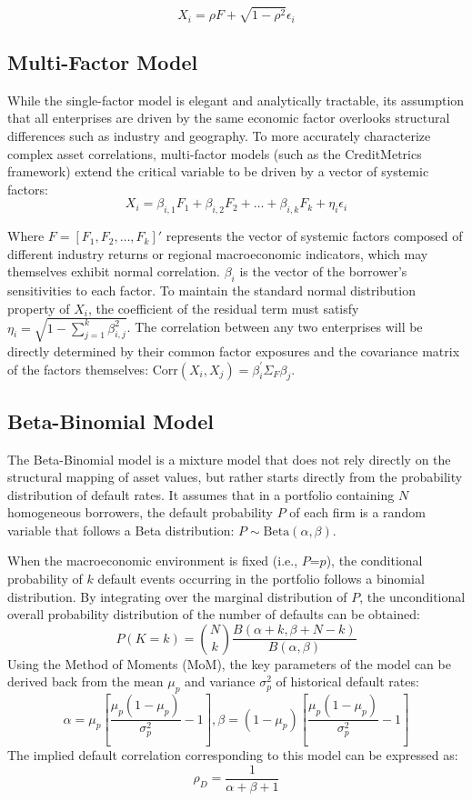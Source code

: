 \documentclass[12pt]{article}
\begin{document}
\[X_i = \rho F + \sqrt{1 - \rho^2} \epsilon_i\]

\subsection{Multi-Factor Model}
While the single-factor model is elegant and analytically tractable, its assumption that all enterprises are driven by the same economic factor overlooks structural differences such as industry and geography. To more accurately characterize complex asset correlations, multi-factor models (such as the CreditMetrics framework) extend the critical variable to be driven by a vector of systemic factors:
\[X_i = \beta_{i,1} F_1 + \beta_{i,2} F_2 + \dots + \beta_{i,k} F_k + \eta_i \epsilon_i\]

Where $F = [F_1, F_2, \dots, F_k]'$ represents the vector of systemic factors composed of different industry returns or regional macroeconomic indicators, which may themselves exhibit normal correlation. $\beta_i$ is the vector of the borrower's sensitivities to each factor. To maintain the standard normal distribution property of $X_i$, the coefficient of the residual term must satisfy $\eta_i = \sqrt{1 - \sum_{j=1}^{k} \beta_{i,j}^2}$. The correlation between any two enterprises will be directly determined by their common factor exposures and the covariance matrix of the factors themselves: $\text{Corr}(X_i, X_j) = \beta_i^\prime \Sigma_F \beta_j$.

\subsection{Beta-Binomial Model}
The Beta-Binomial model is a mixture model that does not rely directly on the structural mapping of asset values, but rather starts directly from the probability distribution of default rates. It assumes that in a portfolio containing $N$ homogeneous borrowers, the default probability $P$ of each firm is a random variable that follows a Beta distribution: $P \sim \text{Beta}(\alpha, \beta)$.

When the macroeconomic environment is fixed (i.e., $P$=$p$), the conditional probability of $k$ default events occurring in the portfolio follows a binomial distribution. By integrating over the marginal distribution of $P$, the unconditional overall probability distribution of the number of defaults can be obtained:
\[P(K=k) = \binom{N}{k} \frac{B(\alpha + k, \beta + N - k)}{B(\alpha, \beta)}\]
Using the Method of Moments (MoM), the key parameters of the model can be derived back from the mean $\mu_p$   and variance $\sigma_p^2$ of historical default rates:
\[\alpha = \mu_p \left[ \frac{\mu_p (1 - \mu_p)}{\sigma_p^2} - 1 \right] , \beta = (1 - \mu_p) \left[ \frac{\mu_p (1 - \mu_p)}{\sigma_p^2} - 1 \right]\]
The implied default correlation corresponding to this model can be expressed as:
\[\rho_D = \frac{1}{\alpha + \beta + 1}\]
\end{document}
